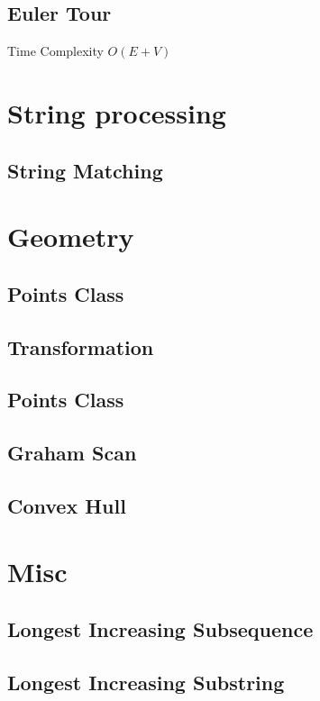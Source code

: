 \documentclass{article}
\begin{document}
\begin{multicols}{3}


\subsection{Euler Tour}
Time Complexity $O(E + V)$


\section{String processing}


\subsection{String Matching}



\section{Geometry}
\subsection{Points Class}


\subsection{Transformation}


\subsection{Points Class}


\subsection{Graham Scan}


\subsection{Convex Hull}


\section{Misc}
\subsection{Longest Increasing Subsequence}


\subsection{Longest Increasing Substring}


\end{multicols}
\end{document}
